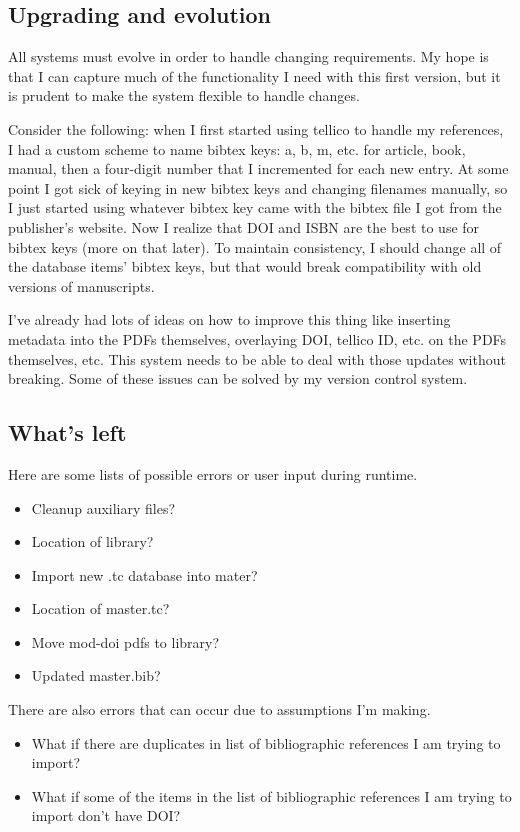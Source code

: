 \documentclass[letterpaper,12pt]{article}
\begin{document}
\subsection{Upgrading and evolution}
All systems must evolve in order to handle changing requirements. My hope is that I can capture much of the functionality I need with this first version, but it is prudent to make the system flexible to handle changes.

Consider the following: when I first started using tellico to handle my references, I had a custom scheme to name bibtex keys: a, b, m, etc. for article, book, manual, then a four-digit number that I incremented for each new entry. At some point I got sick of keying in new bibtex keys and changing filenames manually, so I just started using whatever bibtex key came with the bibtex file I got from the publisher's website. Now I realize that DOI and ISBN are the best to use for bibtex keys (more on that later). To maintain consistency, I should change all of the database items' bibtex keys, but that would break compatibility with old versions of manuscripts.

I've already had lots of ideas on how to improve this thing like inserting metadata into the PDFs themselves, overlaying DOI, tellico ID, etc. on the PDFs themselves, etc. This system needs to be able to deal with those updates without breaking. Some of these issues can be solved by my version control system.





\subsection{What's left}
Here are some lists of possible errors or user input during runtime.

\begin{itemize}
\item Cleanup auxiliary files?
\item Location of library?
\item Import new .tc database into mater?
\item Location of master.tc?
\item Move mod-doi pdfs to library?
\item Updated master.bib?
\end{itemize}

There are also errors that can occur due to assumptions I'm making.

\begin{itemize}
\item What if there are duplicates in list of bibliographic references I am trying to import?
\item What if some of the items in the list of bibliographic references I am trying to import don't have DOI?
\end{itemize}
\end{document}
